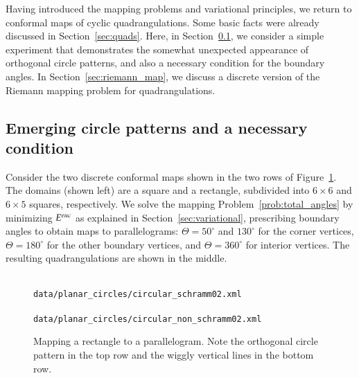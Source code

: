 \documentclass[Thesis]{subfiles}
\begin{document}
Having introduced the mapping problems and variational principles, we
return to conformal maps of cyclic quadrangulations. Some basic facts
were already discussed in Section~\ref{sec:quads}. Here, in
Section~\ref{sec:schramm_and_condition}, we consider a simple
experiment that demonstrates the somewhat unexpected appearance of
orthogonal circle patterns, and also a necessary condition for the
boundary angles. In Section~\ref{sec:riemann_map}, we discuss a
discrete version of the Riemann mapping problem for quadrangulations.

\subsection{Emerging circle patterns and a necessary condition}
\label{sec:schramm_and_condition}

Consider the two discrete conformal maps shown in the two rows of
Figure~\ref{fig:cyclic_parallelogram}. The domains (shown left) are a
square and a rectangle, subdivided into $6\times 6$ and $6\times 5$
squares, respectively.  We solve the mapping
Problem~\ref{prob:total_angles} by minimizing $E^{\euc}$ as explained
in Section~\ref{sec:variational}, prescribing boundary angles to
obtain maps to parallelograms: $\Theta=50^{\circ}$ and $130^{\circ}$
for the corner vertices, $\Theta=180^{\circ}$ for the other boundary
vertices, and $\Theta=360^{\circ}$ for interior vertices. The
resulting quadrangulations are shown in the middle. 
\begin{figure}
\centering
{}\hfill%
\hspace{-0.05\textwidth}%
\\
\scriptsize\tt data/planar\_circles/circular\_schramm02.xml\\
\hfill%
\hspace{-0.05\textwidth}%
\\
\scriptsize\tt data/planar\_circles/circular\_non\_schramm02.xml\\
\caption{
Mapping a rectangle to a parallelogram. Note the orthogonal circle
pattern in the top row and the wiggly vertical lines
in the bottom row. 
}
\label{fig:cyclic_parallelogram}
\end{figure}
\end{document}
